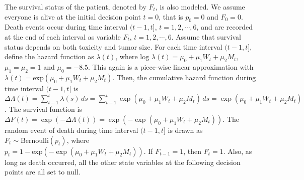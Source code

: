 \documentclass{article}
\newcommand{\lt}{\left}
\newcommand{\rt}{\right}
\begin{document}
The survival status of the patient, denoted by $F_t$, is also modeled. We assume everyone is alive at the initial decision point $t=0$, that is $p_0 =0$ and $F_0 = 0$.  Death events occur during time interval $(t-1, t]$, $t = 1, 2, \cdots, 6$, and are recorded at the end of each interval as variable $F_t$, $t=1,2, \cdots, 6$. Assume that survival status depends on both toxicity and tumor size. For each time interval $(t-1, t]$, define the hazard function as $\lambda(t)$, where $\text{log } \lambda(t) = \mu_0 + \mu_1 W_t + \mu_2 M_t$, $\mu_1 = \mu_2 = 1$ and $\mu_0 = -8.5$. This again is a piece-wise linear approximation with $\lambda(t) = \text{exp}\lt( \mu_0 + \mu_1 W_t + \mu_2 M_t\rt)$. Then, the cumulative hazard function during time interval $(t-1, t]$ is
$\Delta \Lambda(t) = \sum_{t-1}^t \lambda(s) \,ds
= \sum_{t-1}^t \exp\lt( \mu_0 + \mu_1 W_t + \mu_2 M_t\rt) \,ds
=\exp\lt( \mu_0 + \mu_1 W_t + \mu_2 M_t\rt)$.  The survival function is $\Delta F(t) = \exp \lt( - \Delta \Lambda(t)\rt) = \exp \lt( - \exp\lt( \mu_0 + \mu_1 W_t + \mu_2 M_t\rt) \rt)$.
The random event of death during time interval $(t-1, t]$ is drawn as $F_t \sim \text{Bernoulli}(p_t) $, where \\
$p_t =1 - \text{exp}\lt( - \exp\lt( \mu_0 + \mu_1 W_t + \mu_2 M_t\rt) \rt)$.
If $F_{t-1} = 1$, then $F_t =1$. Also, as long as death occurred, all the other state variables at the following decision points are all set to null.\\
\end{document}
